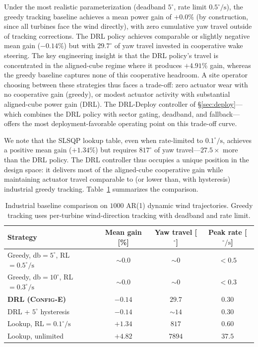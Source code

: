 \documentclass[final,5p,times]{elsarticle}
\begin{document}
Under the most realistic parameterization (deadband $5^\circ$, rate limit $0.5^\circ\!/\!\mathrm{s}$), the greedy tracking baseline achieves a mean power gain of $+0.0\%$ (by construction, since all turbines face the wind directly), with zero cumulative yaw travel outside of tracking corrections. The DRL policy achieves comparable or slightly negative mean gain ($-0.14\%$) but with $29.7^\circ$ of yaw travel invested in cooperative wake steering. The key engineering insight is that the DRL policy's travel is concentrated in the aligned-cube regime where it produces $+4.91\%$ gain, whereas the greedy baseline captures none of this cooperative headroom. A site operator choosing between these strategies thus faces a trade-off: zero actuator wear with no cooperative gain (greedy), or modest actuator activity with substantial aligned-cube power gain (DRL). The DRL-Deploy controller of \S\ref{sec:deploy}---which combines the DRL policy with sector gating, deadband, and fallback---offers the most deployment-favorable operating point on this trade-off curve.

We note that the SLSQP lookup table, even when rate-limited to $0.1^\circ\!/\!\mathrm{s}$, achieves a positive mean gain ($+1.34\%$) but requires $817^\circ$ of yaw travel---$27.5{\times}$ more than the DRL policy. The DRL controller thus occupies a unique position in the design space: it delivers most of the aligned-cube cooperative gain while maintaining actuator travel comparable to (or lower than, with hysteresis) industrial greedy tracking. Table~\ref{tab:industrial_comparison} summarizes the comparison.

\begin{table}[t]
\centering
\caption{Industrial baseline comparison on $1000$ AR(1) dynamic wind trajectories. Greedy tracking uses per-turbine wind-direction tracking with deadband and rate limit.}
\label{tab:industrial_comparison}
\small
\begin{tabular}{lccc}
\toprule
Strategy & Mean gain [\%] & Yaw travel [$^\circ$] & Peak rate [$^\circ\!/\!\mathrm{s}$] \\
\midrule
Greedy, db$=5^\circ$, RL$=0.5^\circ\!/\!\mathrm{s}$ & $\sim 0.0$ & $\sim 0$ & $<0.5$ \\
Greedy, db$=10^\circ$, RL$=0.3^\circ\!/\!\mathrm{s}$ & $\sim 0.0$ & $\sim 0$ & $<0.3$ \\
\textbf{DRL (\textsc{Config-E})} & $\mathbf{-0.14}$ & $\mathbf{29.7}$ & $\mathbf{0.30}$ \\
DRL + $5^\circ$ hysteresis & $-0.14$ & $\sim 14$ & $0.30$ \\
Lookup, RL$=0.1^\circ\!/\!\mathrm{s}$ & $+1.34$ & $817$ & $0.60$ \\
Lookup, unlimited & $+4.82$ & $7894$ & $37.5$ \\
\bottomrule
\end{tabular}
\end{table}
\end{document}

